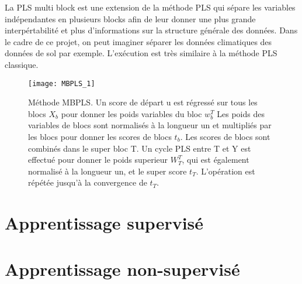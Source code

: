 

La PLS multi block est une extension de la méthode PLS qui sépare les variables indépendantes en plusieurs blocks afin de leur donner une plus grande interpértabilité et plus d'informations sur la structure générale des données. Dans le cadre de ce projet, on peut imaginer séparer les données climatiques des données de sol par exemple.  
L'exécution est très similaire à la méthode PLS classique. 

\begin{figure}[h]
	\texttt{[image: MBPLS\_1]}
	\caption{\label{MBPLSschema} Méthode MBPLS. Un score de départ u est régressé sur tous les blocs $ X_b $ pour donner les poids variables du bloc $ w^T_b $ Les poids des variables de blocs sont normalisés à la longueur un et multipliés par les blocs pour donner les scores de blocs $ t_b $.  Les scores de blocs sont combinés dans le super bloc T. Un cycle PLS entre T et Y est effectué pour donner le poids superieur $ W^T_T $, qui est également normalisé à la longueur un, et le super score $ t_T $. L'opération est répétée jusqu'à la convergence de $ t_T $. }
\end{figure}

\section{Apprentissage supervisé}



\section{Apprentissage non-supervisé}






